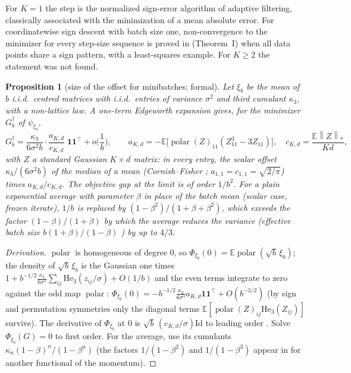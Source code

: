 \documentclass[11pt]{article}
\newtheorem{proposition}[theorem]{Proposition}
\theoremstyle{remark}
\newcommand{\E}{\mathbb{E}}
\newcommand{\nnuc}[1]{\left\|#1\right\|_{*}}
\newcommand{\polar}{\operatorname{polar}}
\newcommand{\ones}{\mathbf{1}}
\begin{document}
For $K=1$ the step is the normalized sign-error algorithm of adaptive filtering, classically associated with the
minimization of a mean absolute error. For coordinatewise sign descent with batch size one, non-convergence to the
minimizer for every step-size sequence is proved in \cite{karimireddy2019error} (Theorem~I) when all data points share
a sign pattern, with a least-squares example. For $K\ge2$ the statement was not found.

\begin{proposition}[size of the offset for minibatches; formal]\label{prop:offset}
Let $\xi_b$ be the mean of $b$ i.i.d.\ centred matrices with i.i.d.\ entries of variance $\sigma^2$ and third cumulant
$\kappa_3$, with a non-lattice law. A one-term Edgeworth expansion gives, for the minimizer $G_b^\dagger$ of $\psi_{\xi_b}$,
\begin{equation}\label{eq:offset}
G_b^\dagger=\frac{\kappa_3}{6\sigma^2b}\cdot\frac{a_{K,d}}{c_{K,d}}\;\ones\ones^\top+o\Big(\frac1b\Big),\qquad
a_{K,d}=-\E\big[\polar(Z)_{11}(Z_{11}^3-3Z_{11})\big],\quad c_{K,d}=\frac{\E\nnuc Z}{Kd},
\end{equation}
with $Z$ a standard Gaussian $K\times d$ matrix: in every entry, the scalar offset $\kappa_3/(6\sigma^2b)$ of the median
of a mean (Cornish--Fisher \cite{cornish1938moments}; $a_{1,1}=c_{1,1}=\sqrt{2/\pi}$) times $a_{K,d}/c_{K,d}$. The
objective gap at the limit is of order $1/b^2$. For a plain exponential average with parameter $\beta$ in place of the
batch mean (scalar case, frozen iterate), $1/b$ is replaced by $(1-\beta^2)/(1+\beta+\beta^2)$, which exceeds the factor
$(1-\beta)/(1+\beta)$ by which the average reduces the variance (effective batch size $b(1+\beta)/(1-\beta)$
\cite{paquette2026phases,xie2026muon}) by up to $4/3$.
\end{proposition}
\begin{proof}[Derivation]
$\polar$ is homogeneous of degree $0$, so $\Phi_{\xi_b}(0)=\E\polar(\sqrt b\,\xi_b)$; the density of $\sqrt b\,\xi_b$ is
the Gaussian one times $1+b^{-1/2}\frac{\kappa_3}{6\sigma^3}\sum_{ij}\mathrm{He}_3(z_{ij}/\sigma)+O(1/b)$ and the even terms
integrate to zero against the odd map $\polar$: $\Phi_{\xi_b}(0)=-b^{-1/2}\frac{\kappa_3}{6\sigma^3}a_{K,d}\ones\ones^\top+O(b^{-3/2})$
(by sign and permutation symmetries only the diagonal terms $\E[\polar(Z)_{ij}\mathrm{He}_3(Z_{ij})]$ survive). The
derivative of $\Phi_{\xi_b}$ at $0$ is $\sqrt b\,(c_{K,d}/\sigma)\mathrm{Id}$ to leading order
\cite{xie2026muon,chen2026when}. Solve $\Phi_{\xi_b}(G)=0$ to first order. For the average, use its cumulants
$\kappa_n(1-\beta)^n/(1-\beta^n)$ (the factors $1/(1-\beta^2)$ and $1/(1-\beta^3)$ appear in \cite{do2026muon} for
another functional of the momentum).
\end{proof}
\end{document}
